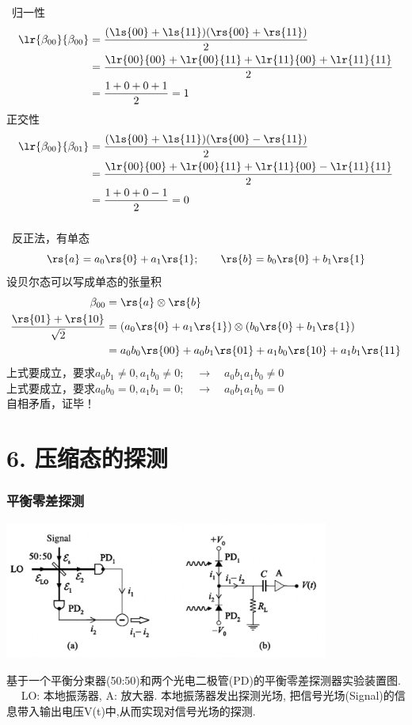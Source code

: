 \begin{frame}
    \frametitle{}
    \例 [9. 试证明贝尔态构成正交归一完备集]{}
    \证~归一性 \[\begin{aligned}
        \lr{\beta_{00}}{\beta_{00}} &= \frac{(\ls{00}+\ls{11})(\rs{00}+\rs{11})}{2} \\
        &= \frac{\lr{00}{00}+\lr{00}{11}+\lr{11}{00}+\lr{11}{11}}{2} \\
        &= \frac{1+0+0+1}{2} = 1 
    \end{aligned}\]
    正交性 \[\begin{aligned}
        \lr{\beta_{00}}{\beta_{01}} &= \frac{(\ls{00}+\ls{11})(\rs{00}-\rs{11})}{2} \\
        &= \frac{\lr{00}{00}+\lr{00}{11}+\lr{11}{00}-\lr{11}{11}}{2} \\
        &= \frac{1+0+0-1}{2} = 0 
    \end{aligned}\]
\end{frame}

\begin{frame}
    \frametitle{}
    \例 [10. 试证明贝尔态是纠缠态]{}
    \证~反正法，有单态
    \[ \rs{a} = a_0\rs{0}+a_1\rs{1}; \qquad \rs{b} = b_0\rs{0}+b_1\rs{1}\]
    设贝尔态可以写成单态的张量积
    \[ \begin{aligned}
    \beta_{00} &= \rs{a}\otimes \rs{b} \\
    \frac{\rs{01}+\rs{10}}{\sqrt{2}} &= (a_0\rs{0}+a_1\rs{1}) \otimes (b_0\rs{0}+b_1\rs{1}) \\
    &= a_0b_0\rs{00}+ a_0b_1\rs{01}+a_1b_0\rs{10}+a_1b_1\rs{11}
    \end{aligned}\]
    上式要成立，要求$a_0b_1\ne 0, a_1b_0 \ne 0; \quad \to \quad a_0b_1a_1b_0\ne 0$ \\
    上式要成立，要求$a_0b_0= 0, a_1b_1 = 0; \quad \to \quad a_0b_1a_1b_0= 0$ \\
    自相矛盾，证毕！
\end{frame}

\section{6. 压缩态的探测}

\begin{frame}
    \frametitle{平衡零差探测}
           \begin{center}
                \includegraphics[width=0.8\textwidth]{figs/14.png}
           \end{center}
       基于一个平衡分束器(50:50)和两个光电二极管(PD)的平衡零差探测器实验装置图. ~~  
       LO: 本地振荡器, A: 放大器. 本地振荡器发出探测光场, 把信号光场(Signal)的信息带入输出电压V(t)中,从而实现对信号光场的探测.  
   \end{frame}
   

